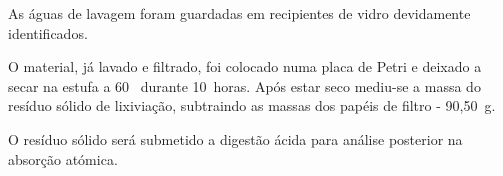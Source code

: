 As águas de lavagem foram guardadas em recipientes de vidro devidamente identificados.

O material, já lavado e filtrado, foi colocado numa placa de Petri e deixado a secar na estufa a 60~\graus{} durante 10~horas.
Após estar seco mediu-se a massa do resíduo sólido de lixiviação, subtraindo as massas dos papéis de filtro - 90,50~g.

O resíduo sólido será submetido a digestão ácida para análise posterior na absorção atómica.